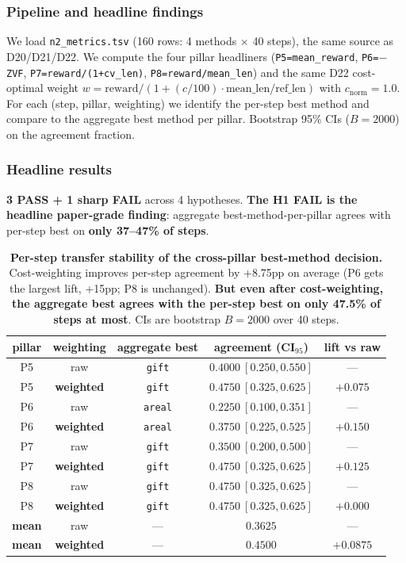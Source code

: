 \documentclass{article}
\begin{document}
\subsubsection{Pipeline and headline findings}\label{sec:synth-d23-pipeline}
We load \texttt{n2\_metrics.tsv} (160 rows: 4 methods $\times$ 40 steps),
the same source as D20/D21/D22. We compute the four pillar headliners
(\texttt{P5=mean\_reward}, \texttt{P6=$-$ZVF}, \texttt{P7=reward/(1+cv\_len)},
\texttt{P8=reward/mean\_len}) and the same D22 cost-optimal weight
$w = \mathrm{reward}/(1 + (c/100) \cdot \mathrm{mean\_len}/\mathrm{ref\_len})$
with $c_{\mathrm{norm}}=1.0$. For each (step, pillar, weighting) we identify
the per-step best method and compare to the aggregate best method per
pillar. Bootstrap 95\% CIs ($B{=}2000$) on the agreement fraction.

\subsubsection{Headline results}\label{sec:synth-d23-results}
\textbf{3 PASS + 1 sharp FAIL} across 4 hypotheses. \textbf{The H1 FAIL
is the headline paper-grade finding}: aggregate best-method-per-pillar
agrees with per-step best on \textbf{only 37--47\% of steps}.

\begin{table}[h]
\centering
\small
\begin{tabular}{ccccc}
\hline
pillar & weighting & aggregate best & agreement (CI$_{95}$) & lift vs raw \\
\hline
P5 & raw       & \texttt{gift}  & $0.4000\ [0.250, 0.550]$ & --- \\
P5 & \textbf{weighted} & \texttt{gift}  & $0.4750\ [0.325, 0.625]$ & $+0.075$ \\
P6 & raw       & \texttt{areal} & $0.2250\ [0.100, 0.351]$ & --- \\
P6 & \textbf{weighted} & \texttt{areal} & $0.3750\ [0.225, 0.525]$ & $\mathbf{+0.150}$ \\
P7 & raw       & \texttt{gift}  & $0.3500\ [0.200, 0.500]$ & --- \\
P7 & \textbf{weighted} & \texttt{gift}  & $0.4750\ [0.325, 0.625]$ & $+0.125$ \\
P8 & raw       & \texttt{gift}  & $0.4750\ [0.325, 0.625]$ & --- \\
P8 & \textbf{weighted} & \texttt{gift}  & $0.4750\ [0.325, 0.625]$ & $+0.000$ \\
\hline
\textbf{mean} & raw & --- & $0.3625$ & --- \\
\textbf{mean} & \textbf{weighted} & --- & $\mathbf{0.4500}$ & $\mathbf{+0.0875}$ \\
\hline
\end{tabular}
\caption{\textbf{Per-step transfer stability of the cross-pillar
best-method decision.} Cost-weighting improves per-step agreement by
+8.75pp on average (P6 gets the largest lift, +15pp; P8 is unchanged).
\textbf{But even after cost-weighting, the aggregate best agrees with
the per-step best on only 47.5\% of steps at most}. CIs are bootstrap
$B{=}2000$ over 40 steps.}
\label{tab:synth-d23-agree}
\end{table}
\end{document}
